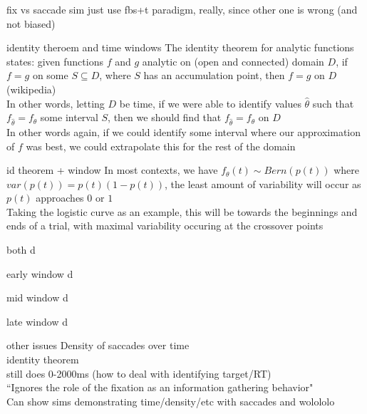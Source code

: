 \documentclass{beamer}
\begin{document}
\begin{frame}{fix vs saccade sim}
just use fbs+t paradigm, really, since other one is wrong (and not biased)
\end{frame}

\begin{frame}{identity theroem and time windows}
The identity theorem for analytic functions states: given functions $f$ and $g$ analytic on (open and connected) domain $D$, if $f = g$ on some $S \subseteq D$, where $S$ has an accumulation point, then $f = g$ on $D$ (wikipedia) \newline \\

In other words, letting $D$ be time, if we were able to identify values $\hat{\theta}$ such that $f_{\hat{\theta}} = f_{\theta}$  some interval $S$, then we should find that $f_{\hat{\theta}} = f_{\theta}$ on $D$ \newline \\

In other words again, if we could identify some interval where our approximation of $f$ was best, we could extrapolate this for the rest of the domain
\end{frame}

\begin{frame}{id theorem + window}
In most contexts, we have $f_{\theta}(t) \sim Bern(p(t))$ where $var(p(t)) = p(t) (1-p(t))$, the least amount of variability will occur as $p(t)$ approaches $0$ or $1$ \newline \\

Taking the logistic curve as an example, this will be towards the beginnings and ends of a trial, with maximal variability occuring at the crossover points
\end{frame}

\begin{frame}{both}
d
\end{frame}

\begin{frame}{early window}
d
\end{frame}
\begin{frame}{mid window}
d
\end{frame}
\begin{frame}{late window}
d
\end{frame}

\begin{frame}{other issues}
Density of saccades over time \newline \\
identity theorem \newline \\
still does 0-2000ms (how to deal with identifying target/RT) \newline \\
``Ignores the role of the fixation as an information gathering behavior" \newline \\

Can show sims demonstrating time/density/etc with saccades and  wolololo
\end{frame}
\end{document}
